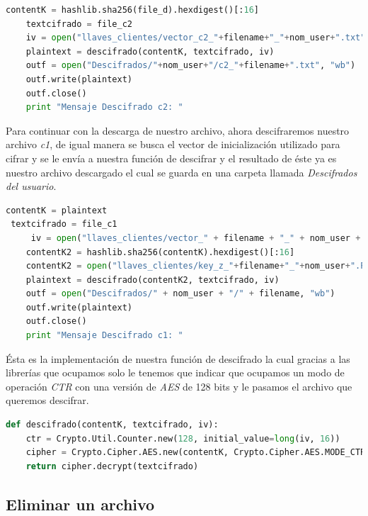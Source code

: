 \begin{lstlisting}[language=Python,frame=single, keywordstyle=\color{blue},breaklines=true, showstringspaces=false]
    contentK = hashlib.sha256(file_d).hexdigest()[:16]
    textcifrado = file_c2
    iv = open("llaves_clientes/vector_c2_"+filename+"_"+nom_user+".txt","rb").read()
    plaintext = descifrado(contentK, textcifrado, iv)
    outf = open("Descifrados/"+nom_user+"/c2_"+filename+".txt", "wb")
    outf.write(plaintext)
    outf.close()
    print "Mensaje Descifrado c2: "
\end{lstlisting}

Para continuar con la descarga de nuestro archivo, ahora descifraremos nuestro archivo \textit{c1}, de igual manera se busca el vector de inicialización utilizado para cifrar y se le envía a nuestra función de descifrar y el resultado de éste ya es nuestro archivo descargado el cual se guarda en una carpeta llamada \textit{Descifrados del usuario}.

\begin{lstlisting}[language=Python,frame=single, keywordstyle=\color{blue},breaklines=true, showstringspaces=false]
 contentK = plaintext
 textcifrado = file_c1
     iv = open("llaves_clientes/vector_" + filename + "_" + nom_user + ".txt", "rb").read()
    contentK2 = hashlib.sha256(contentK).hexdigest()[:16]
    contentK2 = open("llaves_clientes/key_z_"+filename+"_"+nom_user+".PEM", "rb").read()
    plaintext = descifrado(contentK2, textcifrado, iv)
    outf = open("Descifrados/" + nom_user + "/" + filename, "wb")
    outf.write(plaintext)
    outf.close()
    print "Mensaje Descifrado c1: "
\end{lstlisting}

Ésta es la implementación de nuestra función de descifrado la cual gracias a las librerías que ocupamos solo le tenemos que indicar que ocupamos un modo de operación \textit{CTR} con una versión de \textit{AES} de 128 bits y le pasamos el archivo que queremos descifrar.

\begin{lstlisting}[language=Python,frame=single, keywordstyle=\color{blue},breaklines=true, showstringspaces=false]
def descifrado(contentK, textcifrado, iv):
    ctr = Crypto.Util.Counter.new(128, initial_value=long(iv, 16))
    cipher = Crypto.Cipher.AES.new(contentK, Crypto.Cipher.AES.MODE_CTR, counter=ctr)
    return cipher.decrypt(textcifrado)
\end{lstlisting}

\subsection{Eliminar un archivo}

